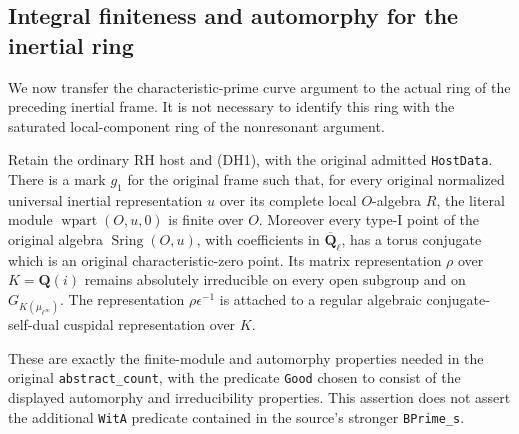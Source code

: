 \subsection{Integral finiteness and automorphy for the inertial ring}
\label{sec:rh-dyadic-host-universal}

We now transfer the characteristic-prime curve argument to the
actual ring of the preceding inertial frame.  It is not necessary
to identify this ring with the saturated local-component ring
of the nonresonant argument.

\begin{theorem}
\label{thm:rh-dyadic-host-universal}
Retain the ordinary RH host and (DH1), with the original admitted
\texttt{HostData}.  There is a mark $g_1$ for the original frame
such that, for every original normalized universal inertial
representation $u$ over its complete local $O$-algebra $R$,
the literal module $\operatorname{wpart}(O,u,0)$ is finite over $O$.
Moreover every type-I point of the original algebra
$\operatorname{Sring}(O,u)$, with coefficients in
$\overline{\mathbf Q}_\ell$, has a torus conjugate which is an
original characteristic-zero point.  Its matrix representation
$\rho$ over $K=\mathbf Q(i)$ remains absolutely irreducible on
every open subgroup and on $G_{K(\mu_{\ell^\infty})}$.
The representation $\rho\epsilon^{-1}$ is attached to a
regular algebraic conjugate-self-dual cuspidal representation
over $K$.

These are exactly the finite-module and automorphy properties
needed in the original \texttt{abstract\_count}, with the
predicate \texttt{Good} chosen to consist of the displayed
automorphy and irreducibility properties.  This assertion does
not assert the additional \texttt{WitA} predicate contained
in the source's stronger \texttt{BPrime\_s}.
\end{theorem}

